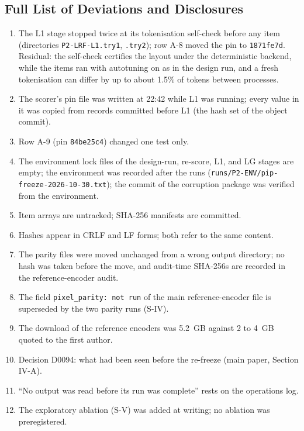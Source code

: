 \documentclass[journal,onecolumn]{IEEEtran}
\theoremstyle{plain}
\begin{document}
\subsection{Full List of Deviations and Disclosures}\label{sup:deviations}
\begin{enumerate}
\item The L1 stage stopped twice at its tokenisation self-check before any item (directories \texttt{P2-LRF-L1.try1}, \texttt{.try2});
row A-8 moved the pin to \texttt{1871fe7d}. Residual: the self-check certifies the layout under the deterministic backend, while the
items ran with autotuning on as in the design run, and a fresh tokenisation can differ by up to about 1.5\% of tokens between processes.
\item The scorer's pin file was written at 22:42 while L1 was running; every value in it was copied from records committed before L1
(the hash set of the object commit).
\item Row A-9 (pin \texttt{84be25c4}) changed one test only.
\item The environment lock files of the design-run, re-score, L1, and LG stages are empty; the environment was recorded after the runs
(\texttt{runs/P2-ENV/pip-freeze-2026-10-30.txt}); the commit of the corruption package was verified from the environment.
\item Item arrays are untracked; SHA-256 manifests are committed.
\item Hashes appear in CRLF and LF forms; both refer to the same content.
\item The parity files were moved unchanged from a wrong output directory; no hash was taken before the move, and audit-time SHA-256s
are recorded in the reference-encoder audit.
\item The field \texttt{pixel\_parity: not run} of the main reference-encoder file is superseded by the two parity runs (S-IV).
\item The download of the reference encoders was 5.2~GB against 2 to 4~GB quoted to the first author.
\item Decision D0094: what had been seen before the re-freeze (main paper, Section IV-A).
\item ``No output was read before its run was complete'' rests on the operations log.
\item The exploratory ablation (S-V) was added at writing; no ablation was preregistered.

\end{enumerate}
\end{document}
